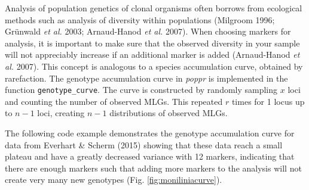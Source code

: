 \documentclass[double,12pt]{beavtex}
\begin{document}
  Analysis of population genetics of clonal organisms often borrows from
  ecological methods such as analysis of diversity within populations
  (Milgroom 1996; Grünwald \emph{et al.} 2003; Arnaud-Hanod \emph{et al.}
  2007). When choosing markers for analysis, it is important to make sure
  that the observed diversity in your sample will not appreciably increase
  if an additional marker is added (Arnaud-Hanod \emph{et al.} 2007). This
  concept is analogous to a species accumulation curve, obtained by
  rarefaction. The genotype accumulation curve in \emph{poppr} is
  implemented in the function \texttt{genotype\_curve}. The curve is
  constructed by randomly sampling \(x\) loci and counting the number of
  observed MLGs. This repeated \(r\) times for 1 locus up to \(n-1\) loci,
  creating \(n-1\) distributions of observed MLGs.
  
  The following code example demonstrates the genotype accumulation curve
  for data from Everhart \& Scherm (2015) showing that these data reach a
  small plateau and have a greatly decreased variance with 12 markers,
  indicating that there are enough markers such that adding more markers
  to the analysis will not create very many new genotypes (Fig.
  \ref{fig:moniliniacurve}).
  
  \begin{Shaded}
  \begin{Highlighting}[]
  \NormalTok{(}\NormalTok{);}
  \NormalTok{(}\NormalTok{);}
  \NormalTok{(}\NormalTok{, } \NormalTok{);}
  
  \NormalTok{(}\NormalTok{);}
   \NormalTok{);}
  \StringTok{ }\NormalTok{() +}\StringTok{ }\NormalTok{();   }
  \StringTok{ }\NormalTok{(}\NormalTok{(} \NormalTok{)); }
  \end{Highlighting}
  \end{Shaded}
  
\end{document}
